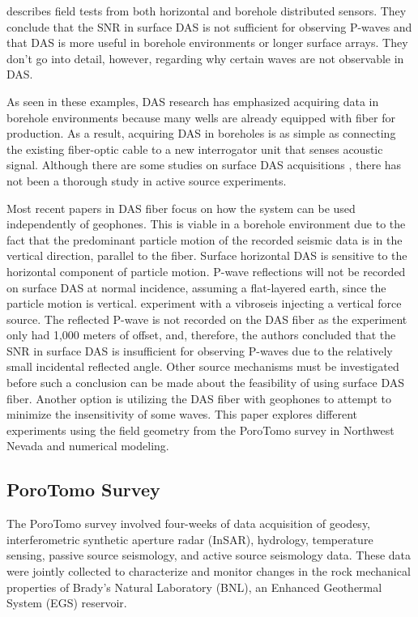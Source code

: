 \citet{daley2013field} describes field tests from both horizontal and borehole distributed sensors. They conclude that the SNR in surface DAS is not sufficient for observing P-waves and that DAS is more useful in borehole environments or longer surface arrays. They don't go into detail, however, regarding why certain waves are not observable in DAS.

As seen in these examples, DAS research has emphasized acquiring data in borehole environments because many wells are already equipped with fiber for production. As a result, acquiring DAS in boreholes is as simple as connecting the existing fiber-optic cable to a new interrogator unit that senses acoustic signal. Although there are some studies on surface DAS acquisitions \citep{daley2013field, hornman2017field}, there has not been a thorough study in active source experiments.

Most recent papers in DAS fiber focus on how the system can be used independently of geophones. This is viable in a borehole environment due to the fact that the predominant particle motion of the recorded seismic data is in the vertical direction, parallel to the fiber. Surface horizontal DAS is sensitive to the horizontal component of particle motion. P-wave reflections will not be recorded on surface DAS at normal incidence, assuming a flat-layered earth, since the particle motion is vertical. \citet{daley2013field} experiment with a vibroseis injecting a vertical force source. The reflected P-wave is not recorded on the DAS fiber as the experiment only had 1,000 meters of offset, and, therefore, the authors concluded that the SNR in surface DAS is insufficient for observing P-waves due to the relatively small incidental reflected angle. Other source mechanisms must be investigated before such a conclusion can be made about the feasibility of using surface DAS fiber. Another option is utilizing the DAS fiber with geophones to attempt to minimize the insensitivity of some waves. This paper explores different experiments using the field geometry from the PoroTomo survey in Northwest Nevada and numerical modeling.

\subsection{PoroTomo Survey}
The PoroTomo survey involved four-weeks of data acquisition of geodesy, interferometric synthetic aperture radar (InSAR), hydrology, temperature sensing, passive source seismology, and active source seismology data. These data were jointly collected to characterize and monitor changes in the rock mechanical properties of Brady's Natural Laboratory (BNL), an Enhanced Geothermal System (EGS) reservoir.

